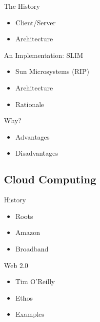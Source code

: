 \documentclass{beamer}
\begin{document}
\begin{frame}{The History}
  \begin{itemize}
  \item Client/Server
  \item Architecture
  \end{itemize}
\end{frame}

\begin{frame}{An Implementation: SLIM}
  \begin{itemize}
  \item Sun Microsystems (RIP)
  \item Architecture
  \item Rationale
  \end{itemize}
\end{frame}

\begin{frame}{Why?}
  \begin{itemize}
  \item Advantages
  \item Disadvantages
  \end{itemize}
\end{frame}


\subsection{Cloud Computing}

\begin{frame}{History}
  \begin{itemize}
  \item Roots
  \item Amazon
  \item Broadband
  \end{itemize}
\end{frame}

\begin{frame}{Web 2.0}
  \begin{itemize}
  \item Tim O'Reilly
  \item Ethos
  \item Examples
  \end{itemize}
\end{frame}
\end{document}
